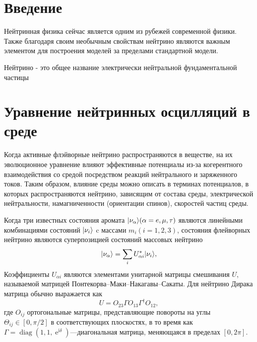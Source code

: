 \documentclass[a4paper,12pt]{article}
\newcommand{\diag}{\operatorname{diag}}
\renewcommand{\exp}{\operatorname{e}}
\renewcommand{\imath}{\mathrm{i}}
\DeclarePairedDelimiter\ket{|}{\rangle}
\begin{document}
	\setcounter{page}{2}
	
	\thispagestyle{empty}
	\tableofcontents
	
	\newpage

	\section{Введение}
	Нейтринная физика сейчас является одним из рубежей современной физики. Также благодаря своим необычным свойствам нейтрино являются важным элементом для построения моделей за пределами стандартной модели.
	
	Нейтрино - это общее название электрически нейтральной фундаментальной частицы
	
	\section{Уравнение нейтринных осцилляций в среде}
	Когда активные флэйворные нейтрино распространяются в веществе, на их
	эволюционное уравнение влияют эффективные потенциалы из-за когерентного
	взаимодействия со средой посредством реакций нейтрального и заряженного
	токов. Таким образом, влияние среды можно описать в терминах потенциалов, в
	которых распространяются нейтрино, зависящим от состава среды, электрической
	нейтральности, намагниченности (ориентации спинов), скоростей частиц среды.
	
	Когда три известных состояния аромата \(\ket{\nu_{\alpha}}(\alpha= e, \mu, \tau)\) являются линейными комбинациями состояний \(\ket{\nu_{i}}\) c массами \(m_{i}(i=1,2,3)\), состояния флейворных нейтрино являются суперпозицией состояний
	массовых нейтрино
	\begin{equation}\label{eq:1}
		\ket{\nu_{\alpha}}=\sum_{i}U_{\alpha i}^{*}\ket{\nu_{i}},
	\end{equation} 
	Коэффициенты \(U_{\alpha i}\) являются элементами унитарной матрицы
	смешивания \(U\), называемой матрицей Понтекорва–Маки–Накагавы–Сакаты. Для нейтрино Дирака матрица обычно выражается как
	\begin{equation}
		U=O_{23}\Gamma O_{13}\Gamma^{\dagger}O_{12},
	\end{equation}
	где \(O_{ij}\) ортогональные матрицы, представляющие повороты на углы \(\Theta_{ij}\in[0, \pi/2]\) в соответствующих плоскостях, в то время как \(\Gamma=\diag(1,1,\exp^{\imath\delta})\)---диагональная матрица, меняющаяся в пределах \([0, 2\pi]\).
	
\end{document}

